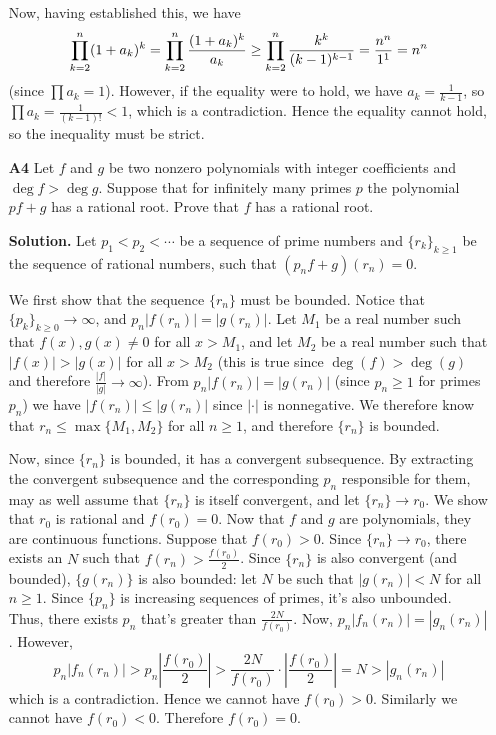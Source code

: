 \documentclass[11pt,a4paper]{article}
\begin{document}
\begin{enumerate}
	Now, having established this, we have 
	\[\displaystyle\prod_{k=2}^n (1+a_k)^k
	=\displaystyle\prod_{k=2}^n \frac{(1+a_k)^k}{a_k}
	\ge \displaystyle\prod_{k=2}^n\frac{k^k}{(k-1)^{k-1}}
	=\frac{n^n}{1^1}
	=n^n
	\]
	(since $\prod a_k=1$). However, if the equality were to hold, we have $a_k=\frac{1}{k-1}$, so $\prod a_k = \frac{1}{(k-1)!}<1$, which is a contradiction. Hence the equality cannot hold, so the inequality must be strict. 
	
	\item[\textbf{A4}] Let $f$ and $g$ be two nonzero polynomials with integer coefficients and $\deg f>\deg g$. Suppose that for infinitely many primes $p$ the polynomial $pf+g$ has a rational root. Prove that $f$ has a rational root.
	
	\textbf{Solution.} Let $p_1<p_2<\cdots$ be a sequence of prime numbers and $\{r_k\}_{k\ge 1}$ be the sequence of rational numbers, such that $(p_nf+g)(r_n)=0$. 
	
	We first show that the sequence $\{r_n\}$ must be bounded. Notice that $\{p_k\}_{k\ge 0}\to\infty$, and $p_n|f(r_n)|=|g(r_n)|$. Let $M_1$ be a real number such that $f(x), g(x)\neq 0$ for all $x>M_1$, and let $M_2$ be a real number such that $|f(x)|>|g(x)|$ for all $x>M_2$ (this is true since $\deg(f)>\deg(g)$ and therefore $\frac{|f|}{|g|}\to\infty$). 
	From $p_n|f(r_n)|=|g(r_n)|$ (since $p_n\ge 1$ for primes $p_n$) we have $|f(r_n)|\le |g(r_n)|$ since $|\cdot|$ is nonnegative. 
	We therefore know that $r_n\le\max\{M_1, M_2\}$ for all $n\ge 1$, and therefore $\{r_n\}$ is bounded. 
	
	Now, since $\{r_n\}$ is bounded, it has a convergent subsequence. By extracting the convergent subsequence and the corresponding $p_n$ responsible for them, may as well assume that $\{r_n\}$ is itself convergent, and let $\{r_n\}\to r_0$. We show that $r_0$ is rational and $f(r_0)=0$. Now that $f$ and $g$ are polynomials, they are continuous functions. Suppose that $f(r_0)>0$. Since $\{r_n\}\to r_0$, there exists an $N$ such that $f(r_n)>\frac{f(r_0)}{2}$. Since $\{r_n\}$ is also convergent (and bounded), $\{g(r_n)\}$ is also bounded: let $N$ be such that $|g(r_n)|<N$ for all $n\ge 1$. Since $\{p_n\}$ is increasing sequences of primes, it's also unbounded. Thus, there exists $p_n$ that's greater than $\frac{2N}{f(r_0)}$. Now, $p_n|f_n(r_n)|=|g_n(r_n)|$. However, 
	\[p_n|f_n(r_n)|>p_n|\frac{f(r_0)}{2}| > \frac{2N}{f(r_0)} \cdot \left|\frac{f(r_0)}{2}\right| = N > |g_n(r_n)|
	\]
	which is a contradiction. Hence we cannot have $f(r_0)>0$. Similarly we cannot have $f(r_0)<0$. Therefore $f(r_0)=0$. 
	

\end{enumerate}
\end{document}
